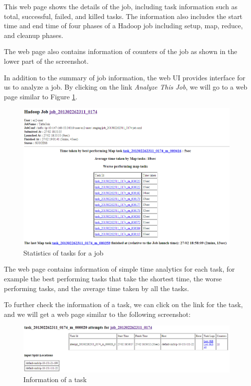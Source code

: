 This web page shows the details of the job, including task information such as total, successful, failed, and killed tasks. The information also includes the start time and end time of four phases of a Hadoop job including setup, map, reduce, and cleanup phases.

The web page also contains information of counters of the job as shown in the lower part of the screenshot.

In addition to the summary of job information, the web UI provides interface for us to analyze a job. By clicking on the link \emph{Analyze This Job}, we will go to a web page similar to Figure \ref{fig:task.statistics}.
\begin{figure}[h]
  \centering
  \includegraphics[width=\textwidth]{figs/5163os_04_03.png}
  \caption{Statistics of tasks for a job}\label{fig:task.statistics}
\end{figure} 

The web page contains information of simple time analytics for each task, for example the best performing tasks that take the shortest time, the worse performing tasks, and the average time taken by all the tasks.

To further check the information of a task, we can click on the link for the task, and we will get a web page similar to the following screenshot:
\begin{figure}[h]
  \centering
  \includegraphics[width=.7\textwidth]{figs/5163os_04_04.png}
  \caption{Information of a task}\label{fig:task.info}
\end{figure} 

